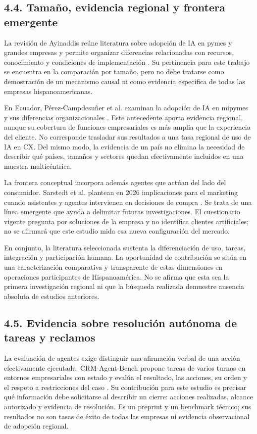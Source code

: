 \documentclass[12pt,letterpaper]{article}
\begin{document}
\subsection*{4.4. Tamaño, evidencia regional y frontera emergente}
La revisión de Ayinaddis reúne literatura sobre adopción de IA en pymes y grandes empresas y permite organizar diferencias relacionadas con recursos, conocimiento y condiciones de implementación \citep{ayinaddis}. Su pertinencia para este trabajo se encuentra en la comparación por tamaño, pero no debe tratarse como demostración de un mecanismo causal ni como evidencia específica de todas las empresas hispanoamericanas.

En Ecuador, Pérez-Campdesuñer et al. examinan la adopción de IA en mipymes y sus diferencias organizacionales \citep{perez}. Este antecedente aporta evidencia regional, aunque su cobertura de funciones empresariales es más amplia que la experiencia del cliente. No corresponde trasladar sus resultados a una tasa regional de uso de IA en CX. Del mismo modo, la evidencia de un país no elimina la necesidad de describir qué países, tamaños y sectores quedan efectivamente incluidos en una muestra multicéntrica.

La frontera conceptual incorpora además agentes que actúan del lado del consumidor. Sarstedt et al. plantean en 2026 implicaciones para el marketing cuando asistentes y agentes intervienen en decisiones de compra \citep{sarstedt}. Se trata de una línea emergente que ayuda a delimitar futuras investigaciones. El cuestionario vigente pregunta por soluciones de la empresa y no identifica clientes artificiales; no se afirmará que este estudio mida esa nueva configuración del mercado.

En conjunto, la literatura seleccionada sustenta la diferenciación de uso, tareas, integración y participación humana. La oportunidad de contribución se sitúa en una caracterización comparativa y transparente de estas dimensiones en operaciones participantes de Hispanoamérica. No se afirma que esta sea la primera investigación regional ni que la búsqueda realizada demuestre ausencia absoluta de estudios anteriores.

\subsection*{4.5. Evidencia sobre resolución autónoma de tareas y reclamos}
La evaluación de agentes exige distinguir una afirmación verbal de una acción efectivamente ejecutada. CRM-Agent-Bench propone tareas de varios turnos en entornos empresariales con estado y evalúa el resultado, las acciones, su orden y el respeto a restricciones del caso \citep{crmagent}. Su contribución para este estudio es precisar qué información debe solicitarse al describir un cierre: acciones realizadas, alcance autorizado y evidencia de resolución. Es un preprint y un benchmark técnico; sus resultados no son tasas de éxito de todas las empresas ni evidencia observacional de adopción regional.
\end{document}
